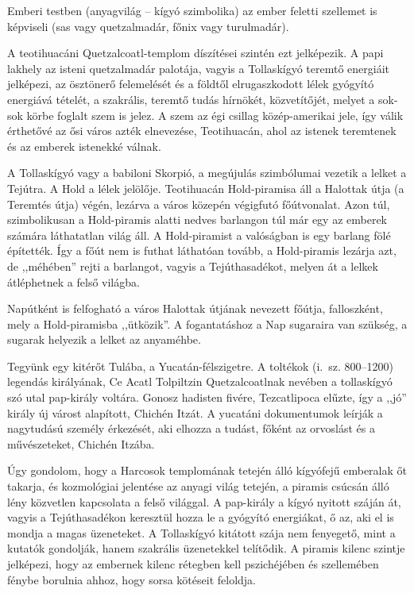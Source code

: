 Emberi testben (anyagvilág -- kígyó szimbolika) az ember feletti
szellemet is képviseli (sas vagy quetzalmadár, főnix vagy turulmadár).

A teotihuacáni Quetzalcoatl-templom díszítései szintén ezt jelképezik.
A papi lakhely az isteni quetzalmadár palotája, vagyis a Tollaskígyó
teremtő energiáit jelképezi, az ösztönerő felemelését és a földtől
elrugaszkodott lélek gyógyító energiává tételét, a szakrális, teremtő
tudás hírnökét, közvetítőjét, melyet a sok-sok körbe foglalt szem is
jelez. A szem az égi csillag közép-amerikai jele, így válik érthetővé az ősi
város azték elnevezése, Teotihuacán, ahol az istenek teremtenek és az
emberek istenekké válnak.


A Tollaskígyó vagy a babiloni Skorpió, a megújulás szimbólumai
vezetik a lelket a Tejútra. A Hold a lélek jelölője. Teotihuacán
Hold-piramisa áll a Halottak útja (a Teremtés útja) végén, lezárva a város
közepén végigfutó főútvonalat. Azon túl, szimbolikusan a Hold-piramis
alatti nedves barlangon túl már egy az emberek számára láthatatlan
világ áll. A Hold-piramist a valóságban is egy barlang fölé építették.
Így a főút nem is futhat láthatóan tovább, a Hold-piramis lezárja azt,
de ,,méhében'' rejti a barlangot, vagyis a Tejúthasadékot, melyen át a
lelkek átléphetnek a felső világba.

Napútként is felfogható a város Halottak útjának nevezett főútja,
falloszként, mely a Hold-piramisba ,,ütközik''. A fogantatáshoz a Nap
sugaraira van szükség, a sugarak helyezik a lelket az anyaméhbe.

Tegyünk egy kitérőt Tulába, a Yucatán-félszigetre. A toltékok (i.~sz.
800--1200) legendás királyának, Ce Acatl Tolpiltzin Quetzalcoatlnak
nevében a tollaskígyó szó utal pap-király voltára. Gonosz hadisten
fivére, Tezcatlipoca elűzte, így a ,,jó'' király új várost alapított, Chichén
Itzát. A yucatáni dokumentumok leírják a nagytudású személy érkezését,
aki elhozza a tudást, főként az orvoslást és a művészeteket,
Chichén Itzába.

Úgy gondolom, hogy a Harcosok templomának tetején álló kígyófejű
emberalak őt takarja, és kozmológiai jelentése az anyagi világ
tetején, a piramis csúcsán álló lény közvetlen kapcsolata a felső világgal.
A pap-király a kígyó nyitott száján át, vagyis a Tejúthasadékon
keresztül hozza le a gyógyító energiákat, ő az, aki el is mondja a
magas üzeneteket. A Tollaskígyó kitátott szája nem fenyegető, mint
a kutatók gondolják, hanem szakrális üzenetekkel telítődik. A piramis
kilenc szintje jelképezi, hogy az embernek kilenc rétegben kell
pszichéjében és szellemében fénybe borulnia ahhoz, hogy sorsa kötéseit
feloldja.

